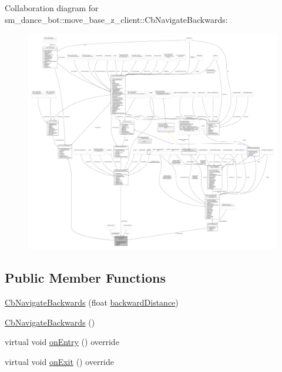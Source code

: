 Collaboration diagram for sm\+\_\+dance\+\_\+bot\+:\+:move\+\_\+base\+\_\+z\+\_\+client\+:\+:Cb\+Navigate\+Backwards\+:
\nopagebreak
\begin{figure}[H]
\begin{center}
\leavevmode
\includegraphics[width=350pt]{classsm__dance__bot_1_1move__base__z__client_1_1CbNavigateBackwards__coll__graph}
\end{center}
\end{figure}
\subsection*{Public Member Functions}
\begin{DoxyCompactItemize}
\item 
\hyperlink{classsm__dance__bot_1_1move__base__z__client_1_1CbNavigateBackwards_aa50683babfa4aacdf65a346db9213f7f}{Cb\+Navigate\+Backwards} (float \hyperlink{classsm__dance__bot_1_1move__base__z__client_1_1CbNavigateBackwards_a4067b6379c6f1c8e7d6d90a1206e98f8}{backward\+Distance})
\item 
\hyperlink{classsm__dance__bot_1_1move__base__z__client_1_1CbNavigateBackwards_af506136a7b7c05d11fa80ce2774806c0}{Cb\+Navigate\+Backwards} ()
\item 
virtual void \hyperlink{classsm__dance__bot_1_1move__base__z__client_1_1CbNavigateBackwards_ae542232601d5c97b3f40ee5e401ab734}{on\+Entry} () override
\item 
virtual void \hyperlink{classsm__dance__bot_1_1move__base__z__client_1_1CbNavigateBackwards_ac8df393df2ed88d8a7660579d2bc0c01}{on\+Exit} () override
\end{DoxyCompactItemize}
